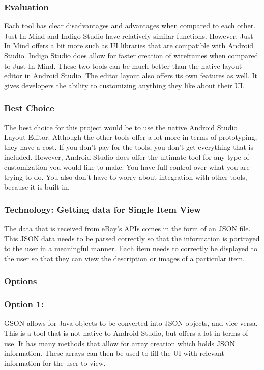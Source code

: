 \documentclass[journal,compsoc, 10pt, draftclsnofoot, onecolumn]{IEEEtran}
\begin{document}
\subsubsection*{Evaluation}
Each tool has clear disadvantages and advantages when compared to each other.
Just In Mind and Indigo Studio have relatively similar functions. However, Just
In Mind offers a bit more such as UI libraries that are compatible with Android
Studio. Indigo Studio does allow for faster creation of wireframes when compared
to Just In Mind. These two tools can be much better than the native layout
editor in Android Studio. The editor layout also offers its own features as
well. It gives developers the ability to customizing anything they like about
their UI.

\subsubsection*{Best Choice}
The best choice for this project would be to use the native Android Studio
Layout Editor. Although the other tools offer a lot more in terms of
prototyping, they have a cost. If you don't pay for the tools, you don't get
everything that is included. However, Android Studio does offer the ultimate
tool for any type of customization you would like to make. You have full control
over what you are trying to do. You also don't have to worry about integration
with other tools, because it is built in.

\subsubsection{Technology: Getting data for Single Item View}
The data that is received from eBay's APIs comes in the form of an JSON file.
This JSON data needs to be parsed correctly so that the information is portrayed
to the user in a meaningful manner. Each item needs to correctly be displayed to
the user so that they can view the description or images of a particular item.

\subsubsection*{Options}
\subsubsection*{Option 1: }
GSON allows for Java objects to be converted into JSON objects, and vice versa.
This is a tool that is not native to Android Studio, but offers a lot in terms
of use. It has many methods that allow for array creation which holds JSON
information. These arrays can then be used to fill the UI with relevant
information for the user to view.
\end{document}
